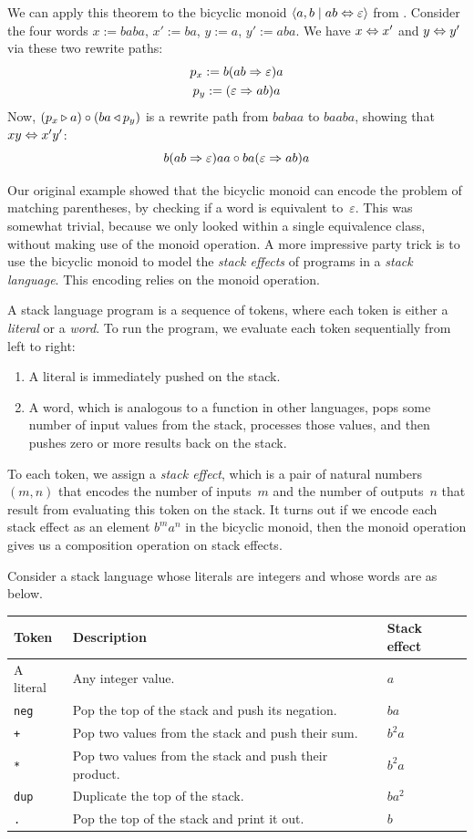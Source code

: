 \documentclass[../generics]{subfiles}
\begin{document}
\begin{example}\label{bicyclic 5}
We can apply this theorem to the bicyclic monoid $\langle a, b \mid ab\Leftrightarrow\varepsilon\rangle$ from . Consider the four words $x := baba$, $x' := ba$, $y := a$, $y' := aba$. We have $x\Leftrightarrow x'$ and $y\Leftrightarrow y'$ via these two rewrite paths:
\begin{gather*}
p_x := b(ab\Rightarrow\varepsilon) a\\
p_y := (\varepsilon\Rightarrow ab) a
\end{gather*}
Now, $(p_x\triangleright a)\circ (ba\triangleleft p_y)$ is a rewrite path from $babaa$ to $baaba$, showing that $xy\Leftrightarrow x' y'$:
\[b(ab\Rightarrow\varepsilon) aa\circ ba(\varepsilon\Rightarrow ab) a\]

Our original example showed that the bicyclic monoid can encode the problem of matching parentheses, by checking if a word is equivalent to~$\varepsilon$. This was somewhat trivial, because we only looked within a single equivalence class, without making use of the monoid operation. A more impressive party trick is to use the bicyclic monoid to model the \emph{stack effects} of programs in a \emph{stack language}. This encoding relies on the monoid operation.

A stack language program is a sequence of tokens, where each token is either a \emph{literal} or a \emph{word}. To run the program, we evaluate each token sequentially from left to right:
\begin{enumerate}
\item A literal is immediately pushed on the stack.
\item A word, which is analogous to a function in other languages, pops some number of input values from the stack, processes those values, and then pushes zero or more results back on the stack.
\end{enumerate}

To each token, we assign a \emph{stack effect}, which is a pair of natural numbers $(m,n)$ that encodes the number of inputs~$m$ and the number of outputs~$n$ that result from evaluating this token on the stack. It turns out if we encode each stack effect as an element $b^m a^n$ in the bicyclic monoid, then the monoid operation gives us a composition operation on stack effects.

Consider a stack language whose literals are integers and whose words are as below.
\begin{center}
\begin{tabular}{lll}
\toprule
\textbf{Token}&\textbf{Description}&\textbf{Stack effect}\\
\midrule
A literal&Any integer value.&$a$\\
\texttt{neg}&Pop the top of the stack and push its negation.&$ba$\\
\texttt{+}&Pop two values from the stack and push their sum.&$b^2a$\\
\texttt{*}&Pop two values from the stack and push their product.&$b^2a$\\
\texttt{dup}&Duplicate the top of the stack.&$ba^2$\\
\texttt{.}&Pop the top of the stack and print it out.&$b$\\
\bottomrule
\end{tabular}
\end{center}


\end{example}
\end{document}
